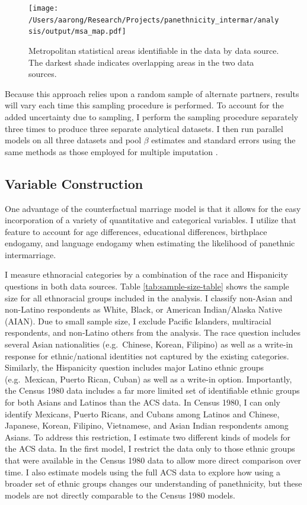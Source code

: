 \documentclass[11pt,]{article}
\begin{document}
\begin{figure}
\centering
\texttt{[image: /Users/aarong/Research/Projects/panethnicity\_intermar/analysis/output/msa\_map.pdf]}
\caption{\label{fig:metro-areas}Metropolitan statistical areas identifiable in the data by data source. The darkest shade indicates overlapping areas in the two data sources.}
\end{figure}

Because this approach relies upon a random sample of alternate partners, results will vary each time this sampling procedure is performed. To account for the added uncertainty due to sampling, I perform the sampling procedure separately three times to produce three separate analytical datasets. I then run parallel models on all three datasets and pool \(\beta\) estimates and standard errors using the same methods as those employed for multiple imputation \citep{rubin_multiple_1987, gullickson_counterfactual_2021}.

\hypertarget{variable-construction}{%
\subsection{Variable Construction}\label{variable-construction}}

One advantage of the counterfactual marriage model is that it allows for the easy incorporation of a variety of quantitative and categorical variables. I utilize that feature to account for age differences, educational differences, birthplace endogamy, and language endogamy when estimating the likelihood of panethnic intermarriage.

I measure ethnoracial categories by a combination of the race and Hispanicity questions in both data sources. Table \ref{tab:sample-size-table} shows the sample size for all ethnoracial groups included in the analysis. I classify non-Asian and non-Latino respondents as White, Black, or American Indian/Alaska Native (AIAN). Due to small sample size, I exclude Pacific Islanders, multiracial respondents, and non-Latino others from the analysis. The race question includes several Asian nationalities (e.g.~Chinese, Korean, Filipino) as well as a write-in response for ethnic/national identities not captured by the existing categories. Similarly, the Hispanicity question includes major Latino ethnic groups (e.g.~Mexican, Puerto Rican, Cuban) as well as a write-in option. Importantly, the Census 1980 data includes a far more limited set of identifiable ethnic groups for both Asians and Latinos than the ACS data. In Census 1980, I can only identify Mexicans, Puerto Ricans, and Cubans among Latinos and Chinese, Japanese, Korean, Filipino, Vietnamese, and Asian Indian respondents among Asians. To address this restriction, I estimate two different kinds of models for the ACS data. In the first model, I restrict the data only to those ethnic groups that were available in the Census 1980 data to allow more direct comparison over time. I also estimate models using the full ACS data to explore how using a broader set of ethnic groups changes our understanding of panethnicity, but these models are not directly comparable to the Census 1980 models.
\end{document}
